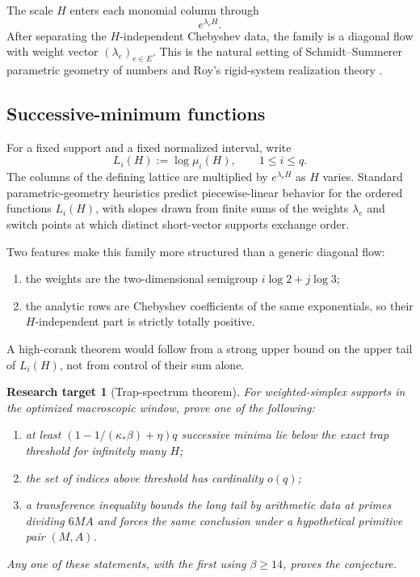 \documentclass[11pt,oneside]{article}
\newtheorem{target}[theorem]{Research target}
\theoremstyle{definition}
\theoremstyle{remark}
\begin{document}
The scale $H$ enters each monomial column through
\[
 e^{\lambda_eH}.
\]
After separating the $H$-independent Chebyshev data, the family is a diagonal flow with weight
vector $(\lambda_e)_{e\in E}$.  This is the natural setting of Schmidt--Summerer parametric
geometry of numbers and Roy's rigid-system realization theory
\cite{SchmidtSummerer2009,SchmidtSummerer2013,Roy2015}.

\subsection{Successive-minimum functions}

For a fixed support and a fixed normalized interval, write
\[
 L_i(H):=\log\mu_i(H),\qquad 1\le i\le q.
\]
The columns of the defining lattice are multiplied by $e^{\lambda_eH}$ as $H$ varies.
Standard parametric-geometry heuristics predict piecewise-linear behavior for the ordered
functions $L_i(H)$, with slopes drawn from finite sums of the weights $\lambda_e$ and switch
points at which distinct short-vector supports exchange order.

Two features make this family more structured than a generic diagonal flow:

\begin{enumerate}
\item the weights are the two-dimensional semigroup $i\log2+j\log3$;
\item the analytic rows are Chebyshev coefficients of the same exponentials, so their
$H$-independent part is strictly totally positive.
\end{enumerate}

A high-corank theorem would follow from a strong upper bound on the upper tail of
$L_i(H)$, not from control of their sum alone.

\begin{target}[Trap-spectrum theorem]
\label{target:trap-spectrum}
For weighted-simplex supports in the optimized macroscopic window, prove one of the following:
\begin{enumerate}
\item at least $(1-1/(\kappa_*\beta)+\eta)q$ successive minima lie below the exact trap
threshold for infinitely many $H$;
\item the set of indices above threshold has cardinality $o(q)$;
\item a transference inequality bounds the long tail by arithmetic data at primes dividing
$6MA$ and forces the same conclusion under a hypothetical primitive pair $(M,A)$.
\end{enumerate}
Any one of these statements, with the first using $\beta\ge14$, proves the conjecture.
\end{target}
\end{document}
